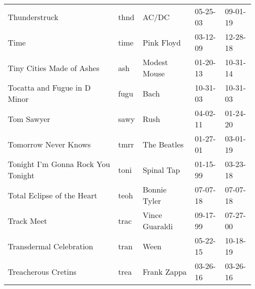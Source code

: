 \begin{longtable}{p{}p{}p{}p{}p{}}
                                                           Thunderstruck &          thnd &                                                    AC/DC &              05-25-03 &             09-01-19 \\
                                                                    Time &          time &                                               Pink Floyd &              03-12-09 &             12-28-18 \\
                                               Tiny Cities Made of Ashes &           ash &                                             Modest Mouse &              01-20-13 &             10-31-14 \\
                                            Tocatta and Fugue in D Minor &          fugu &                                                     Bach &              10-31-03 &             10-31-03 \\
                                                              Tom Sawyer &          sawy &                                                     Rush &              04-02-11 &             01-24-20 \\
                                                    Tomorrow Never Knows &          tmrr &                                              The Beatles &              01-27-01 &             03-01-19 \\
                                      Tonight I'm Gonna Rock You Tonight &          toni &                                               Spinal Tap &              01-15-99 &             03-23-18 \\
                                              Total Eclipse of the Heart &          teoh &                                             Bonnie Tyler &              07-07-18 &             07-07-18 \\
                                                              Track Meet &          trac &                                           Vince Guaraldi &              09-17-99 &             07-27-00 \\
                                                 Transdermal Celebration &          tran &                                                     Ween &              05-22-15 &             10-18-19 \\
                                                     Treacherous Cretins &          trea &                                              Frank Zappa &              03-26-16 &             03-26-16 \\

\end{longtable}
